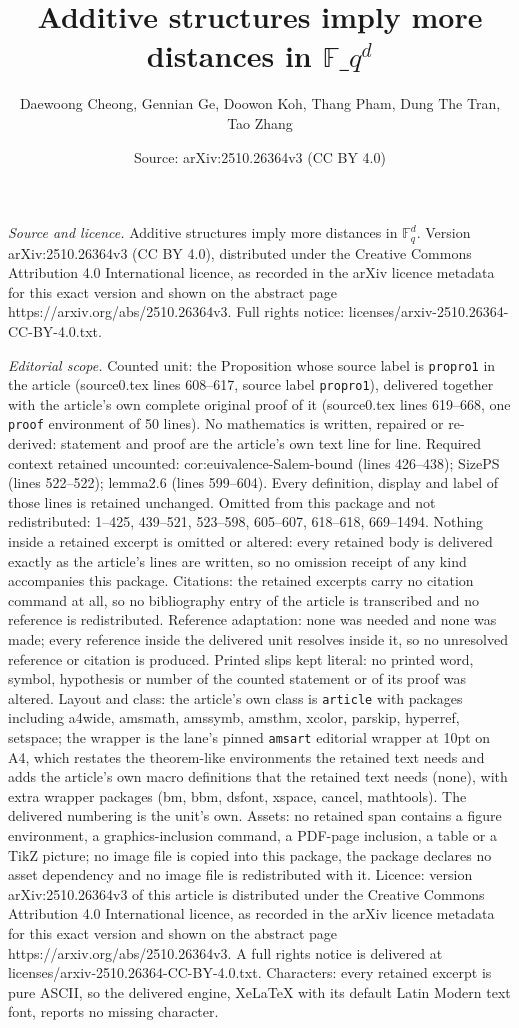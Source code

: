 \documentclass[10pt,a4paper]{amsart}
\title[Additive structures imply more distances in $\mathbb{F}\_q^d$]{Additive structures imply more distances in $\mathbb{F}\_q^d$}
\author{Daewoong Cheong, Gennian Ge, Doowon Koh, Thang Pham, Dung The Tran, Tao Zhang}
\date{Source: arXiv:2510.26364v3 (CC BY 4.0)}
\begin{document}
\maketitle

\noindent\emph{Source and licence.} Additive structures imply more distances in $\mathbb{F}_q^d$. Version arXiv:2510.26364v3 (CC BY 4.0), distributed under the Creative Commons Attribution 4.0 International licence, as recorded in the arXiv licence metadata for this exact version and shown on the abstract page https://arxiv.org/abs/2510.26364v3. Full rights notice: licenses/arxiv-2510.26364-CC-BY-4.0.txt.\par\smallskip

\noindent\textit{Editorial scope.} Counted unit: the Proposition whose source label is \texttt{propro1} in the article (source0.tex lines 608--617, source label \texttt{propro1}), delivered together with the article's own complete original proof of it (source0.tex lines 619--668, one \texttt{proof} environment of 50 lines). No mathematics is written, repaired or re-derived: statement and proof are the article's own text line for line. Required context retained uncounted: cor:euivalence-Salem-bound (lines 426--438); SizePS (lines 522--522); lemma2.6 (lines 599--604). Every definition, display and label of those lines is retained unchanged. Omitted from this package and not redistributed: 1--425, 439--521, 523--598, 605--607, 618--618, 669--1494. Nothing inside a retained excerpt is omitted or altered: every retained body is delivered exactly as the article's lines are written, so no omission receipt of any kind accompanies this package. Citations: the retained excerpts carry no citation command at all, so no bibliography entry of the article is transcribed and no reference is redistributed. Reference adaptation: none was needed and none was made; every reference inside the delivered unit resolves inside it, so no unresolved reference or citation is produced. Printed slips kept literal: no printed word, symbol, hypothesis or number of the counted statement or of its proof was altered. Layout and class: the article's own class is \texttt{article} with packages including a4wide, amsmath, amssymb, amsthm, xcolor, parskip, hyperref, setspace; the wrapper is the lane's pinned \texttt{amsart} editorial wrapper at 10pt on A4, which restates the theorem-like environments the retained text needs and adds the article's own macro definitions that the retained text needs (none), with extra wrapper packages (bm, bbm, dsfont, xspace, cancel, mathtools). The delivered numbering is the unit's own. Assets: no retained span contains a figure environment, a graphics-inclusion command, a PDF-page inclusion, a table or a TikZ picture; no image file is copied into this package, the package declares no asset dependency and no image file is redistributed with it. Licence: version arXiv:2510.26364v3 of this article is distributed under the Creative Commons Attribution 4.0 International licence, as recorded in the arXiv licence metadata for this exact version and shown on the abstract page https://arxiv.org/abs/2510.26364v3. A full rights notice is delivered at licenses/arxiv-2510.26364-CC-BY-4.0.txt. Characters: every retained excerpt is pure ASCII, so the delivered engine, XeLaTeX with its default Latin Modern text font, reports no missing character.
\end{document}
